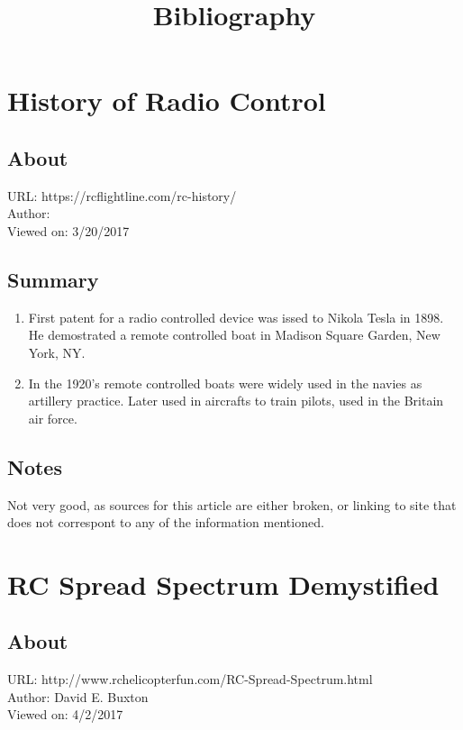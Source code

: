 \documentclass{article}
\title{Bibliography}
\begin{document}
\section{History of Radio Control}
	\subsection{About}
	URL: https://rcflightline.com/rc-history/\\
	Author:\\
	Viewed on: 3/20/2017

	\subsection{Summary}
	\begin{enumerate}
	\item First patent for a radio controlled device was issed to
	Nikola Tesla in 1898. He demostrated a remote controlled boat in
	Madison Square Garden, New York, NY.
	\item In the 1920's remote controlled boats were widely used in
	the navies as artillery practice. Later used in aircrafts to
	train pilots, used in the Britain air force.
	\end{enumerate}

	\subsection{Notes}
	Not very good, as sources for this article are either broken, or
	linking to site that does not correspont to any of the information
	mentioned.
	
\section{RC Spread Spectrum Demystified}
	\subsection{About}
	URL: http://www.rchelicopterfun.com/RC-Spread-Spectrum.html \\
	Author: David E. Buxton\\
	Viewed on: 4/2/2017
\end{document}
